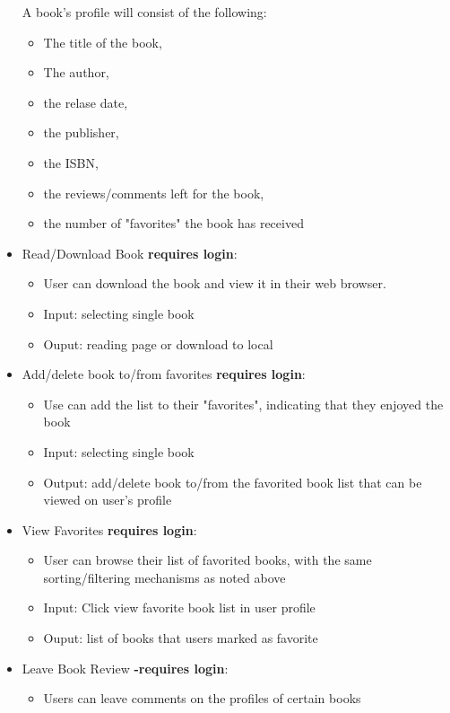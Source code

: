 \documentclass[letter, 12pt, titlepage]{article}
\begin{document}
\begin{itemize}
	      A book's profile will consist of the following:
	      \begin{itemize}
		      \item The title of the book,
		      \item The author,
		      \item the relase date,
		      \item the publisher,
		      \item the ISBN,
		      \item the reviews/comments left for the book,
		      \item the number of "favorites" the book has received
	      \end{itemize}
	\item Read/Download Book \textbf{requires login}:
	      \begin{itemize}
		      \item  User can download the book and view it in their web browser.
		      \item  Input: selecting single book
		      \item  Ouput: reading page or download to local
	      \end{itemize}
	\item Add/delete book to/from favorites \textbf{requires login}:
	      \begin{itemize}
		      \item  Use can add the list to their "favorites", indicating that they enjoyed the book
		      \item  Input: selecting single book
		      \item  Output: add/delete book to/from the favorited book list that can be viewed on user's profile
	      \end{itemize}
	\item  View Favorites  \textbf{requires login}:
	      \begin{itemize}
		      \item  User can browse their list of favorited books, with the same sorting/filtering mechanisms as noted above
		      \item  Input: Click view favorite book list in user profile
		      \item  Ouput: list of books that users marked as favorite
	      \end{itemize}
	\item Leave Book Review \textbf{-requires login}:
	      \begin{itemize}
		      \item  Users can leave comments on the profiles of certain books

\end{itemize}
\end{itemize}
\end{document}
